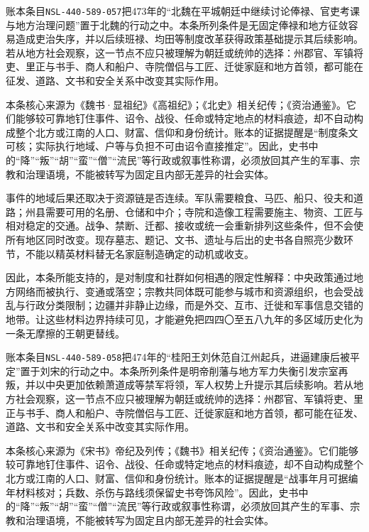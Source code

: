 账本条目\texttt{NSL-440-589-057}把473年的“北魏在平城朝廷中继续讨论俸禄、官吏考课与地方治理问题”置于北魏的行动之中。本条所列条件是无固定俸禄和地方征敛容易造成吏治失序，并以后续班禄、均田等制度改革获得政策基础提示其后续影响。若从地方社会观察，这一节点不应只被理解为朝廷或统帅的选择：州郡官、军镇将吏、里正与书手、商人和船户、寺院僧侣与工匠、迁徙家庭和地方首领，都可能在征发、道路、文书和安全关系中改变其实际作用。

本条核心来源为《魏书·显祖纪》《高祖纪》；《北史》相关纪传；《资治通鉴》。它们能够较可靠地钉住事件、诏令、战役、任命或特定地点的材料痕迹，却不自动构成整个北方或江南的人口、财富、信仰和身份统计。账本的证据提醒是“制度条文可核；实际执行地域、户等与负担不可由诏令直接推定”。因此，史书中的“降”“叛”“胡”“蛮”“僧”“流民”等行政或叙事性称谓，必须放回其产生的军事、宗教和治理语境，不能被转写为固定且内部无差异的社会实体。

事件的地域后果还取决于资源链是否连续。军队需要粮食、马匹、船只、役夫和道路；州县需要可用的名册、仓储和中介；寺院和造像工程需要施主、物资、工匠与相对稳定的交通。战争、禁断、迁都、接收或统一会重新排列这些条件，但不会使所有地区同时改变。现存墓志、题记、文书、遗址与后出的史书各自照亮少数环节，不能以精英材料替无名家庭制造确定的动机或收支。

因此，本条所能支持的，是对制度和社群如何相遇的限定性解释：中央政策通过地方网络而被执行、变通或落空；宗教共同体既可能参与城市和资源组织，也会受战乱与行政分类限制；边疆并非静止边缘，而是外交、互市、迁徙和军事信息交错的地带。让这些材料边界持续可见，才能避免把四四〇至五八九年的多区域历史化为一条无摩擦的王朝更替线。

账本条目\texttt{NSL-440-589-058}把474年的“桂阳王刘休范自江州起兵，进逼建康后被平定”置于刘宋的行动之中。本条所列条件是明帝削藩与地方军力失衡引发宗室再叛，并以中央更加依赖萧道成等禁军将领，军人权势上升提示其后续影响。若从地方社会观察，这一节点不应只被理解为朝廷或统帅的选择：州郡官、军镇将吏、里正与书手、商人和船户、寺院僧侣与工匠、迁徙家庭和地方首领，都可能在征发、道路、文书和安全关系中改变其实际作用。

本条核心来源为《宋书》帝纪及列传；《魏书》相关纪传；《资治通鉴》。它们能够较可靠地钉住事件、诏令、战役、任命或特定地点的材料痕迹，却不自动构成整个北方或江南的人口、财富、信仰和身份统计。账本的证据提醒是“战事年月可据编年材料核对；兵数、杀伤与路线须保留史书夸饰风险”。因此，史书中的“降”“叛”“胡”“蛮”“僧”“流民”等行政或叙事性称谓，必须放回其产生的军事、宗教和治理语境，不能被转写为固定且内部无差异的社会实体。

